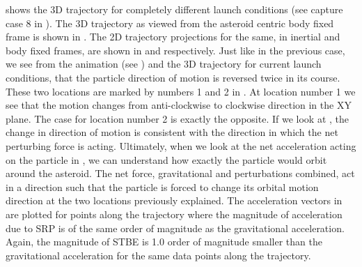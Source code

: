  shows the 3D trajectory for completely different launch conditions (see capture case 8 in ). The 3D trajectory as viewed from the asteroid centric body fixed frame is shown in . The 2D trajectory projections for the same, in inertial and body fixed frames, are shown in  and  respectively. Just like in the previous case, we see from the animation (see ) and the 3D trajectory for current launch conditions, that the particle direction of motion is reversed twice in its course. These two locations are marked by numbers 1 and 2 in . At location number 1 we see that the motion changes from anti-clockwise to clockwise direction in the XY plane. The case for location number 2 is exactly the opposite. If we look at , the change in direction of motion is consistent with the direction in which the net perturbing force is acting. Ultimately, when we look at the net acceleration acting on the particle in , we can understand how exactly the particle would orbit around the asteroid. The net force, gravitational and perturbations combined, act in a direction such that the particle is forced to change its orbital motion direction at the two locations previously explained. The acceleration vectors in  are plotted for points along the trajectory where the magnitude of acceleration due to \gls{SRP} is of the same order of magnitude as the gravitational acceleration. Again, the magnitude of \gls{STBE} is 1.0 order of magnitude smaller than the gravitational acceleration for the same data points along the trajectory.
